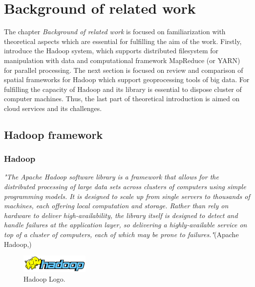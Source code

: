 \documentclass[a4paper,12pt,oneside]{report}
\begin{document}
	
	
	
	
	
	
	\newpage
	\chapter*{Background of related
		work}
	The chapter \textit{Background of related work} is focused on familiarization
	with theoretical aspects which are essential for fulfilling the aim of the work.
	Firstly, introduce the Hadoop system, which supports distributed filesystem for
	manipulation with data and computational framework MapReduce (or YARN) for
	parallel processing. 
	The next section is focused on review and comparison of spatial frameworks for
	Hadoop which support geoprocessing tools of big data. For fulfilling the
	capacity of Hadoop and its library is essential to dispose cluster of computer
	machines. Thus, the last  part of theoretical introduction is aimed on cloud
	services and its challenges.
	\section{Hadoop framework}
	\label{sec:hadoop}
	\subsection*{Hadoop}
	\emph{"The Apache Hadoop software library is a framework that allows for the
		distributed
		processing of large data sets across clusters of computers using simple
		programming 
		models. It is designed to scale up from single servers to 
		thousands of machines, each offering local computation and storage. Rather
		than rely 
		on hardware to deliver high-availability, the library itself is
		designed to detect and handle failures at the application layer, so
		delivering a 
		highly-available service on top of a cluster of computers,
		each of which may be prone to failures."}(Apache Hadoop,\cite{hadoop_web})
	\begin{figure}[!htbp]
		\centering
		\includegraphics[width=0.3\textwidth]{./img/664px-Hadoop_logo.png}
		\caption[Hadoop architecture2]{\centering Hadoop Logo.}
	\end{figure}
	
\end{document}

